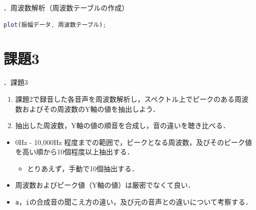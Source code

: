 \documentclass[aspectratio=43]{beamer}
\newcommand{\showsec}{\thesection ．}
\begin{document}
\begin{frame}[t,containsverbatim]{\showsec 周波数解析（周波数テーブルの作成）}
    \begin{lstlisting}[language={Matlab},frame={lines},xleftmargin={0mm}]
plot(振幅データ, 周波数テーブル);
    \end{lstlisting}
    \begin{figure}
        \centering
    \end{figure}
\end{frame}
\section{課題3}
\begin{frame}[t]{\showsec 課題3}
    \begin{exampleblock}{}
        \begin{enumerate}
            \item 課題2で録音した各音声を周波数解析し，スペクトル上でピークのある周波数およびその周波数のY軸の値を抽出しよう．
            \item 抽出した周波数，Y軸の値の順音を合成し，音の違いを聴き比べる．
        \end{enumerate}
    \end{exampleblock}
    \dotfill
    \begin{itemize}
        \item 0Hz - 10,000Hz 程度までの範囲で，ピークとなる周波数，及びそのピーク値を高い順から10個程度以上抽出する．\\
              \begin{itemize}
                  \item とりあえず，手動で10個抽出する．
              \end{itemize}
        \item 周波数およびピーク値（Y軸の値）は厳密でなくて良い．
        \item \texttt{a}，\texttt{i}の合成音の聞こえ方の違い，及び元の音声との違いについて考察する．
    \end{itemize}
\end{frame}
\end{document}
